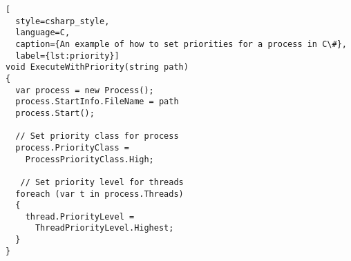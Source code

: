 \begin{lstlisting}[
  style=csharp_style,
  language=C, 
  caption={An example of how to set priorities for a process in C\#},
  label={lst:priority}]
void ExecuteWithPriority(string path)
{
  var process = new Process();
  process.StartInfo.FileName = path
  process.Start();

  // Set priority class for process
  process.PriorityClass = 
    ProcessPriorityClass.High;
    
   // Set priority level for threads
  foreach (var t in process.Threads)
  {
    thread.PriorityLevel =
      ThreadPriorityLevel.Highest;
  }
}
\end{lstlisting}
